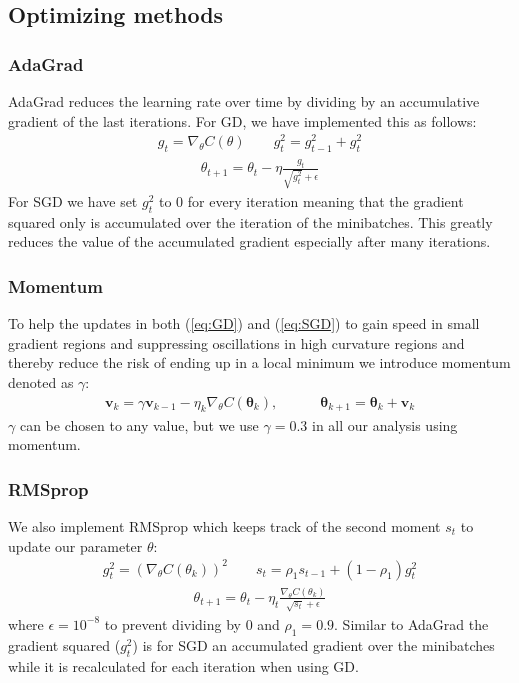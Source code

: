 \documentclass[11pt]{article}
\begin{document}
\subsection{Optimizing methods}
\subsubsection*{AdaGrad}
AdaGrad reduces the learning rate over time by dividing by an accumulative gradient of the last iterations. For GD, we have implemented this as follows:
\begin{align*}
    g_t = \nabla_\theta C(\theta) \quad\quad g_t^2 = g_{t-1}^2 + g_t^2
\end{align*}
\begin{align*}
    \theta_{t+1} = \theta_t - \eta \frac{g_t}{\sqrt{g_t^2} + \epsilon}
\end{align*}
For SGD we have set $g_t^2$ to 0 for every iteration meaning that the gradient squared only is accumulated over the iteration of the minibatches. This greatly reduces the value of the accumulated gradient especially after many iterations.
\subsubsection*{Momentum}
To help the updates in both (\ref{eq:GD}) and (\ref{eq:SGD}) to gain speed in small gradient regions and suppressing oscillations in high curvature regions and thereby reduce the risk of ending up in a local minimum we introduce momentum denoted as $\gamma$:
\begin{align}
    \label{eq:GD_mom}
    \boldsymbol{v}_{k} = \gamma\boldsymbol{v}_{k-1} - \eta_k \nabla_\theta C(\boldsymbol{\theta}_k),\quad\quad\quad\boldsymbol{\theta}_{k+1} = \boldsymbol{\theta}_k + \boldsymbol{v}_k
\end{align}
$\gamma$ can be chosen to any value, but we use $\gamma=0.3$ in all our analysis using momentum.

\subsubsection*{RMSprop}
We also implement RMSprop which keeps track of the second moment $s_t$ to update our parameter $\theta$:
\begin{align*}
    g_t^2 = (\nabla_\theta C(\theta_k))^2  \quad\quad s_t = \rho_1 s_{t-1} + (1- \rho_1)g_t^2
\end{align*}
\begin{align*}
    \theta_{t+1} = \theta_t - \eta_t \frac{\nabla_\theta C(\theta_k)}{\sqrt{s_t} + \epsilon }
\end{align*}
where $\epsilon=10^{-8}$ to prevent dividing by 0 and $\rho_1 = 0.9$. Similar to AdaGrad the gradient squared ($g_t^2$) is for SGD an accumulated gradient over the minibatches while it is recalculated for each iteration when using GD.
\end{document}
